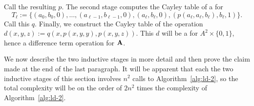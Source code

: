   
  

























  Call the resulting \ldto $p$.  The second stage computes the Cayley table of a \ldto for
  \[T_\ell := \{(a_0, b_0, 0), \dots,
  (a_{\ell-1}, b_{\ell-1},0), (a_{\ell}, b_{\ell},0), (p(a_{\ell}, a_{\ell}, b_{\ell}), b_\ell, 1)\}.
  \]
  Call this \ldto $q$. Finally, we construct the Cayley table of the operation
  $d(x,y,z) := q(x, p(x,y,y), p(x,y,z))$.
  This $d$ will be a \ldto for $A^2 \times \{0,1\}$, hence a difference term operation for $\mathbf{A}$.
  
  We now describe the two inductive stages in more detail and then prove the claim made at the end of the 
  last paragraph. It will be apparent that 
  each the two inductive stages of this section involves 
  $n^2$ calls to Algorithm~\ref{alg:ld-2}, so the total complexity will be on the order of 
  $2n^2$ times the complexity of Algorithm~\ref{alg:ld-2}.
  

